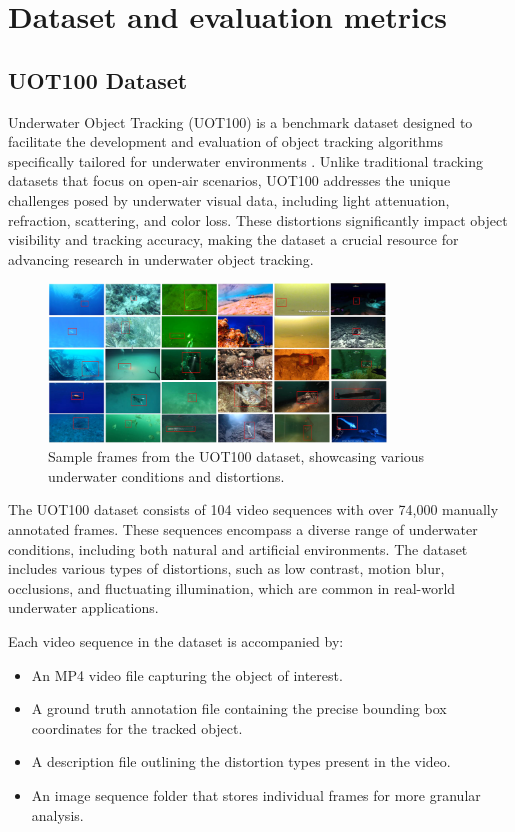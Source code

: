 \chapter{Dataset and evaluation metrics}
\label{chap:dataset}
\section{UOT100 Dataset}
Underwater Object Tracking (UOT100) is a benchmark dataset designed to facilitate the development and evaluation of object tracking algorithms specifically tailored for underwater environments \cite{kezebou2019underwater,panetta2021comprehensive}. Unlike traditional tracking datasets that focus on open-air scenarios, UOT100 addresses the unique challenges posed by underwater visual data, including light attenuation, refraction, scattering, and color loss. These distortions significantly impact object visibility and tracking accuracy, making the dataset a crucial resource for advancing research in underwater object tracking.

\begin{figure}[ht]
    \centering
    \includegraphics[width=0.8\textwidth]{images/uot100.png}
    \caption{Sample frames from the UOT100 dataset, showcasing various underwater conditions and distortions.}
    \label{fig:uot100_samples}
\end{figure}

The UOT100 dataset consists of 104 video sequences with over 74,000 manually annotated frames. These sequences encompass a diverse range of underwater conditions, including both natural and artificial environments. The dataset includes various types of distortions, such as low contrast, motion blur, occlusions, and fluctuating illumination, which are common in real-world underwater applications.

Each video sequence in the dataset is accompanied by:
\begin{itemize}
    \item An MP4 video file capturing the object of interest.
    \item A ground truth annotation file containing the precise bounding box coordinates for the tracked object.
    \item A description file outlining the distortion types present in the video.
    \item An image sequence folder that stores individual frames for more granular analysis.
\end{itemize}

